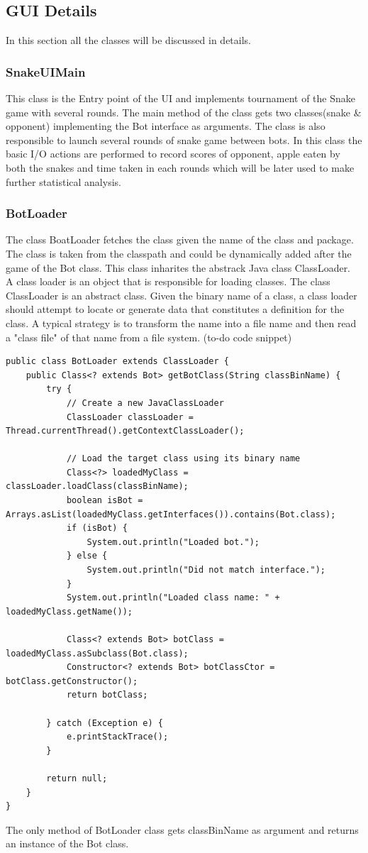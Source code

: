 \documentclass[a4paper,12pt]{article}
\begin{document}
\subsection{GUI Details}
In this section all the classes will be discussed in details. 
\subsubsection{SnakeUIMain}
This class is the Entry point of the UI and implements tournament of the Snake game with several rounds. The main method of the class gets two classes(snake \& opponent) implementing the Bot interface as arguments. The class is also responsible to launch several rounds of snake game between bots. In this class the basic I/O actions are performed to record scores of opponent, apple eaten by both the snakes and time taken in each rounds which will be later used to make further statistical analysis.
\subsubsection{BotLoader}
The class BoatLoader fetches the class given the name  of the class and package. The class is taken from the classpath and could be dynamically added after the game of the Bot class. This class inharites the abstrack Java class ClassLoader.\\
A class loader is an object that is responsible for loading classes. The class ClassLoader is an abstract class. Given the binary name of a class, a class loader should attempt to locate or generate data that constitutes a definition for the class. A typical strategy is to transform the name into a file name and then read a "class file" of that name from a file system.%
(to-do code snippet)
\begin{verbatim}
public class BotLoader extends ClassLoader {
    public Class<? extends Bot> getBotClass(String classBinName) {
        try {
            // Create a new JavaClassLoader
            ClassLoader classLoader = Thread.currentThread().getContextClassLoader();

            // Load the target class using its binary name
            Class<?> loadedMyClass = classLoader.loadClass(classBinName);
            boolean isBot = Arrays.asList(loadedMyClass.getInterfaces()).contains(Bot.class);
            if (isBot) {
                System.out.println("Loaded bot.");
            } else {
                System.out.println("Did not match interface.");
            }
            System.out.println("Loaded class name: " + loadedMyClass.getName());

            Class<? extends Bot> botClass = loadedMyClass.asSubclass(Bot.class);
            Constructor<? extends Bot> botClassCtor = botClass.getConstructor();
            return botClass;

        } catch (Exception e) {
            e.printStackTrace();
        }

        return null;
    }
}

\end{verbatim}
\newpage
The only method of BotLoader class gets classBinName as argument and returns an instance of the Bot class.
\end{document}

